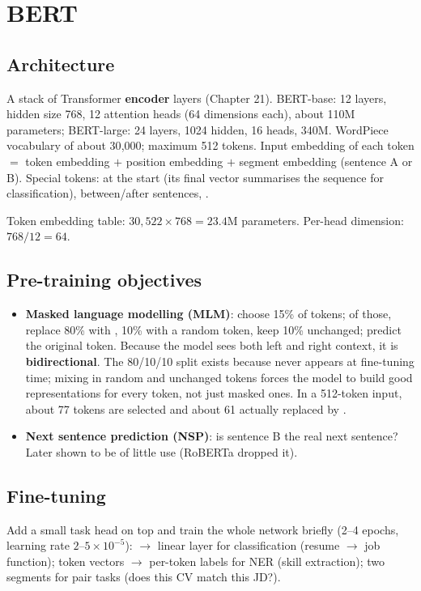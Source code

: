 \section{BERT}
\subsection{Architecture}
A stack of Transformer \textbf{encoder} layers (Chapter 21). BERT-base: 12 layers, hidden size 768, 12 attention heads (64 dimensions each), about 110M
parameters; BERT-large: 24 layers, 1024 hidden, 16 heads, 340M. WordPiece vocabulary of about 30{,}000; maximum 512 tokens. Input embedding of each
token $=$ token embedding $+$ position embedding $+$ segment embedding (sentence A or B). Special tokens: \code{[CLS]} at the start (its final vector
summarises the sequence for classification), \code{[SEP]} between/after sentences, \code{[MASK]}.
\begin{example}
Token embedding table: $30{,}522\times768 = 23.4$M parameters. Per-head dimension: $768/12 = 64$.
\end{example}

\subsection{Pre-training objectives}
\begin{itemize}
\item \textbf{Masked language modelling (MLM)}: choose 15\% of tokens; of those, replace 80\% with \code{[MASK]}, 10\% with a random token, keep 10\%
  unchanged; predict the original token. Because the model sees both left and right context, it is \textbf{bidirectional}. The 80/10/10 split exists
  because \code{[MASK]} never appears at fine-tuning time; mixing in random and unchanged tokens forces the model to build good representations for
  every token, not just masked ones. In a 512-token input, about 77 tokens are selected and about 61 actually replaced by \code{[MASK]}.
\item \textbf{Next sentence prediction (NSP)}: is sentence B the real next sentence? Later shown to be of little use (RoBERTa dropped it).
\end{itemize}

\subsection{Fine-tuning}
Add a small task head on top and train the whole network briefly (2--4 epochs, learning rate $2$--$5\times10^{-5}$): \code{[CLS]} $\to$ linear layer
for classification (resume $\to$ job function); token vectors $\to$ per-token labels for NER (skill extraction); two segments for pair tasks (does
this CV match this JD?).

